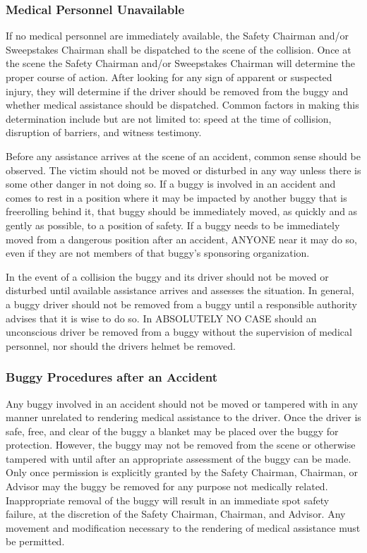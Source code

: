 	\subsubsection{Medical Personnel Unavailable}
	If no medical personnel are immediately available, the Safety Chairman
	and/or Sweepstakes Chairman shall be dispatched to the scene of the collision.
	Once at the scene the Safety Chairman and/or Sweepstakes Chairman will
	determine the proper course of action. After looking for any sign of apparent
	or suspected injury, they will determine if the driver should be removed from
	the buggy and whether medical assistance should be dispatched. Common factors
	in making this determination include but are not limited to: speed at the time
	of collision, disruption of barriers, and witness testimony. 

	Before any assistance arrives at the scene of an accident, common sense should
	be observed. The victim should not be moved or disturbed in any way unless
	there is some other danger in not doing so. If a buggy is involved in an
	accident and comes to rest in a position where it may be impacted by another
	buggy that is freerolling behind it, that buggy should be immediately moved, as
	quickly and as gently as possible, to a position of safety. If a buggy needs to
	be immediately moved from a dangerous position after an accident, ANYONE near
	it may do so, even if they are not members of that buggy's sponsoring
	organization. 

	In the event of a collision the buggy and its driver should not be moved or
	disturbed until available assistance arrives and assesses the situation. In
	general, a buggy driver should not be removed from a buggy until a responsible
	authority advises that it is wise to do so. In ABSOLUTELY NO CASE should an
	unconscious driver be removed from a buggy without the supervision of medical
	personnel, nor should the drivers helmet be removed.
	
	\subsubsection{Buggy Procedures after an Accident}
	Any buggy involved in an accident should not be moved or tampered with in any 
	manner unrelated to rendering medical assistance to the driver. Once the driver 
	is safe, free, and clear of the buggy a blanket may be placed over the buggy for
	protection. However, the buggy may not be removed from the scene or otherwise 
	tampered with until after an appropriate assessment of the buggy can be made. 
	Only once permission is explicitly granted by the Safety Chairman, Chairman, or 
	Advisor may the buggy be removed for any purpose not medically related. 
	Inappropriate removal of the buggy will result in an immediate spot safety 
	failure, at the discretion of the Safety Chairman, Chairman, and Advisor. 
	Any movement and modification necessary to the rendering of medical assistance 
	must be permitted.

